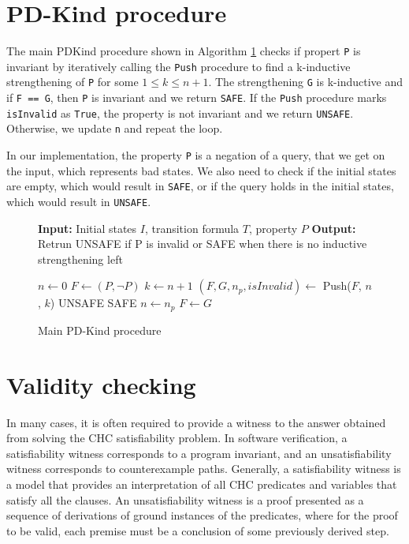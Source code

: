 \newpage 
\section{PD-Kind procedure}

\noindent The main PDKind procedure shown in Algorithm \ref{alg:4} checks if propert \texttt{P} is invariant by iteratively calling the \texttt{Push} procedure to find a k-inductive strengthening of \texttt{P} for some $1 \leq k \leq n + 1$. The strengthening \texttt{G} is k-inductive and if \texttt{F == G}, then \texttt{P} is invariant and we return \texttt{SAFE}. If the \texttt{Push} procedure marks \texttt{isInvalid} as \texttt{True}, the property is not invariant and we return \texttt{UNSAFE}. Otherwise, we update \texttt{n} and repeat the loop.

In our implementation, the property \texttt{P} is a negation of a query, that we get on the input, which represents bad states. We also need to check if the initial states are empty, which would result in \texttt{SAFE}, or if the query holds in the initial states, which would result in \texttt{UNSAFE}.

\begin{figure}[h]
\begin{mdframed}
\begin{algorithmic}[1]
\State \textbf{Input:} Initial states $I$, transition formula $T$, property $P$
\State \textbf{Output:} Retrun UNSAFE if P is invalid or SAFE when there is no inductive strengthening left

\State $n \gets 0$
    \State $F \gets (P, \neg P)$
        \State $k \gets n + 1$
        \State $(F, G, n_p, isInvalid) \gets$ Push($F$, $n$, $k$)
        \State \Return UNSAFE
        \EndIf
        \State \Return SAFE
        \EndIf
        \State $n \gets n_p$
        \State $F \gets G$
    \EndWhile

\end{algorithmic}
\end{mdframed}
\caption{Main PD-Kind procedure}\label{alg:4}
\end{figure}

\section{Validity checking}
\noindent In many cases, it is often required to provide a witness to the answer obtained from solving the CHC satisfiability problem. In software verification, a satisfiability witness corresponds to a program invariant, and an unsatisfiability witness corresponds to counterexample paths. Generally, a satisfiability witness is a model that provides an interpretation of all CHC predicates and variables that satisfy all the clauses. An unsatisfiability witness is a proof presented as a sequence of derivations of ground instances of the predicates, where for the proof to be valid, each premise must be a conclusion of some previously derived step.

